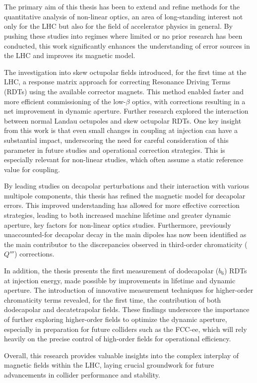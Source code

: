 \chapter{}
\label{chapter:conclusions}

The primary aim of this thesis has been to extend and refine methods for the quantitative analysis
of non-linear optics, an area of long-standing interest not only for the LHC but also for the field
of accelerator physics in general. By pushing these studies into regimes where limited or no prior
research has been conducted, this work significantly enhances the understanding of error sources in
the LHC and improves its magnetic model.

The investigation into skew octupolar fields introduced, for the first time at the LHC, a response
matrix approach for correcting Resonance Driving Terms (RDTs) using the available corrector magnets.
This method enabled faster and more efficient commissioning of the low-$\beta$ optics, with
corrections resulting in a net improvement in dynamic aperture. Further research explored the
interaction between normal Landau octupoles and skew octupolar RDTs. One key insight from this work
is that even small changes in coupling at injection can have a substantial impact, underscoring the
need for careful consideration of this parameter in future studies and operational correction
strategies. This is especially relevant for non-linear studies, which often assume a static
reference value for coupling.

By leading studies on decapolar perturbations and their interaction with various multipole
components, this thesis has refined the magnetic model for decapolar errors. This improved
understanding has allowed for more effective correction strategies, leading to both increased
machine lifetime and greater dynamic aperture, key factors for non-linear optics studies.
Furthermore, previously unaccounted-for decapolar decay in the main dipoles has now been identified
as the main contributor to the discrepancies observed in third-order chromaticity ($Q'''$)
corrections.

In addition, the thesis presents the first measurement of dodecapolar ($b_6$) RDTs at injection
energy, made possible by improvements in lifetime and dynamic aperture. The introduction of
innovative measurement techniques for higher-order chromaticity terms revealed, for the first time,
the contribution of both dodecapolar and decatetrapolar fields. These findings underscore the
importance of further exploring higher-order fields to optimize the dynamic aperture, especially in
preparation for future colliders such as the FCC-ee, which will rely heavily on the precise control
of high-order fields for operational efficiency.

Overall, this research provides valuable insights into the complex interplay of magnetic fields
within the LHC, laying crucial groundwork for future advancements in collider performance and
stability.
